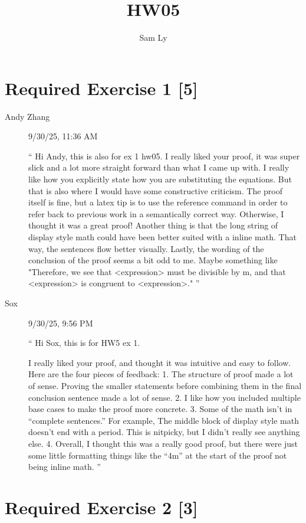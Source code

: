 \documentclass{article}
\title{HW05}
\author{Sam Ly}
\begin{document}
\maketitle

\section*{Required Exercise 1 [5]}
\begin{description}
    \item[Andy Zhang] {
        9/30/25, 11:36 AM

        ``
       Hi Andy, this is also for ex 1 hw05. I really liked your proof, it 
       was super slick and a lot more straight forward than what I came up with. 
       I really like how you explicitly state how you are substituting the equations.
        But that is also where I would have some constructive criticism. The proof 
        itself is fine, but a latex tip is to use the reference command in order to refer back to previous work in a semantically correct way. Otherwise, I thought it was a great proof! Another thing is that the long string of display style math could have been better suited with a inline math. That way, the sentences flow better visually. Lastly, the wording of the conclusion of the proof seems a bit odd to me. Maybe something like "Therefore, we see that <expression> must be divisible by m, and that <expression> is congruent to <expression>." 
        ''
    }

    \item[Sox] {
        9/30/25, 9:56 PM

        ``
        Hi Sox, this is for HW5 ex 1.

I really liked your proof, and thought it was intuitive and easy to follow. Here are the four pieces of feedback:
1. The structure of proof made a lot of sense. Proving the smaller statements before combining them in the final conclusion sentence made a lot of sense.
2. I like how you included multiple base cases to make the proof more concrete.
3. Some of the math isn’t in “complete sentences.” For example, The middle block of display style math doesn’t end with a period. This is nitpicky, but I didn’t really see anything else.
4. Overall, I thought this was a really good proof, but there were just some little formatting things like the “4m” at the start of the proof not being inline math.
        ''
    }
\end{description}


\section*{Required Exercise 2 [3]}
\end{document}
